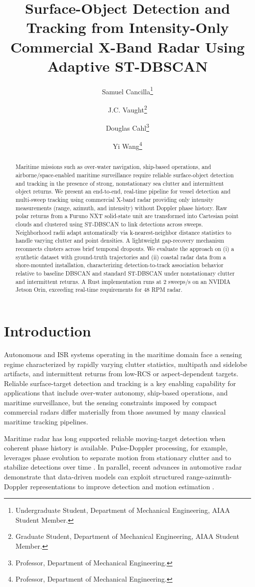 \documentclass[conf]{new-aiaa}
\title{Surface-Object Detection and Tracking from Intensity-Only Commercial X-Band Radar Using Adaptive ST-DBSCAN}
\author{Samuel Cancilla\footnote{Undergraduate Student, Department of Mechanical Engineering, AIAA Student Member.}}
\author{J.C. Vaught\footnote{Graduate Student, Department of Mechanical Engineering, AIAA Student Member.}}
\author{Douglas Cahl\footnote{Professor, Department of Mechanical Engineering.}}
\author{Yi Wang\footnote{Professor, Department of Mechanical Engineering.}}
\affil{University of South Carolina, Columbia, SC, 29208}
\begin{document}
\maketitle

\begin{abstract}
\noindent Maritime missions such as over-water navigation, ship-based operations, and airborne/space-enabled maritime surveillance require reliable surface-object detection and tracking in the presence of strong, nonstationary sea clutter and intermittent object returns. We present an end-to-end, real-time pipeline for vessel detection and multi-sweep tracking using commercial X-band radar providing only intensity measurements (range, azimuth, and intensity) without Doppler phase history. Raw polar returns from a Furuno NXT solid-state unit are transformed into Cartesian point clouds and clustered using ST-DBSCAN to link detections across sweeps. Neighborhood radii adapt automatically via k-nearest-neighbor distance statistics to handle varying clutter and point densities. A lightweight gap-recovery mechanism reconnects clusters across brief temporal dropouts. We evaluate the approach on (i) a synthetic dataset with ground-truth trajectories and (ii) coastal radar data from a shore-mounted installation, characterizing detection-to-track association behavior relative to baseline DBSCAN and standard ST-DBSCAN under nonstationary clutter and intermittent returns. A Rust implementation runs at 2 sweeps/s on an NVIDIA Jetson Orin, exceeding real-time requirements for 48 RPM radar.
\end{abstract}

\section{Introduction}
Autonomous and ISR systems operating in the maritime domain face a sensing regime characterized by rapidly varying clutter statistics, multipath and sidelobe artifacts, and intermittent returns from low-RCS or aspect-dependent targets. Reliable surface-target detection and tracking is a key enabling capability for applications that include over-water autonomy, ship-based operations, and maritime surveillance, but the sensing constraints imposed by compact commercial radars differ materially from those assumed by many classical maritime tracking pipelines.

Maritime radar has long supported reliable moving-target detection when coherent phase history is available. Pulse-Doppler processing, for example, leverages phase evolution to separate motion from stationary clutter and to stabilize detections over time \cite{delaney2000lincoln}. In parallel, recent advances in automotive radar demonstrate that data-driven models can exploit structured range-azimuth-Doppler representations to improve detection and motion estimation \cite{major2019rad}.
\end{document}
